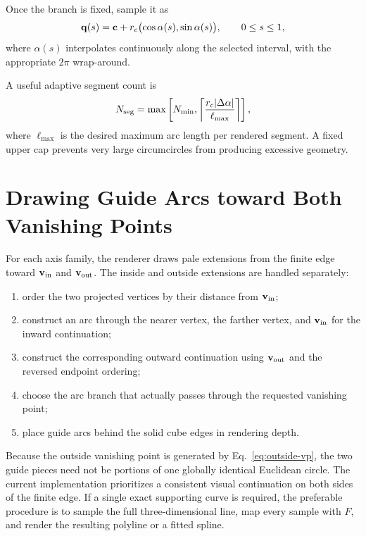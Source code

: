 Once the branch is fixed, sample it as
\begin{equation}
  \vb q(s)=\vb c+r_c
  \bigl(\cos\alpha(s),\sin\alpha(s)\bigr),
  \qquad 0\leq s\leq1,
  \label{eq:arc-sampling}
\end{equation}
where $\alpha(s)$ interpolates continuously along the selected interval, with the appropriate $2\pi$ wrap-around.

A useful adaptive segment count is
\begin{equation}
  N_{\rm seg}=\max\left[
  N_{\min},
  \left\lceil\frac{r_c|\Delta\alpha|}{\ell_{\max}}\right\rceil
  \right],
  \label{eq:adaptive-segments}
\end{equation}
where $\ell_{\max}$ is the desired maximum arc length per rendered segment.  A fixed upper cap prevents very large circumcircles from producing excessive geometry.

\section{Drawing Guide Arcs toward Both Vanishing Points}
For each axis family, the renderer draws pale extensions from the finite edge toward $\vb v_{\rm in}$ and $\vb v_{\rm out}$.  The inside and outside extensions are handled separately:
\begin{enumerate}
  \item order the two projected vertices by their distance from $\vb v_{\rm in}$;
  \item construct an arc through the nearer vertex, the farther vertex, and $\vb v_{\rm in}$ for the inward continuation;
  \item construct the corresponding outward continuation using $\vb v_{\rm out}$ and the reversed endpoint ordering;
  \item choose the arc branch that actually passes through the requested vanishing point;
  \item place guide arcs behind the solid cube edges in rendering depth.
\end{enumerate}

Because the outside vanishing point is generated by Eq.~\eqref{eq:outside-vp}, the two guide pieces need not be portions of one globally identical Euclidean circle.  The current implementation prioritizes a consistent visual continuation on both sides of the finite edge.  If a single exact supporting curve is required, the preferable procedure is to sample the full three-dimensional line, map every sample with $F$, and render the resulting polyline or a fitted spline.

